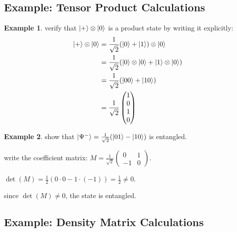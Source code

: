 \documentclass[11pt,a4paper]{article}
\theoremstyle{definition}
\newtheorem{example}{Example}[section]
\theoremstyle{remark}
\begin{document}
\subsection{Example: Tensor Product Calculations}

\begin{example}
verify that $\ket{+} \otimes \ket{0}$ is a product state by writing it explicitly:
\begin{align}
\ket{+} \otimes \ket{0} &= \frac{1}{\sqrt{2}}(\ket{0} + \ket{1}) \otimes \ket{0} \\
&= \frac{1}{\sqrt{2}}(\ket{0} \otimes \ket{0} + \ket{1} \otimes \ket{0}) \\
&= \frac{1}{\sqrt{2}}(\ket{00} + \ket{10}) \\
&= \frac{1}{\sqrt{2}}\begin{pmatrix} 1 \\ 0 \\ 1 \\ 0 \end{pmatrix}
\end{align}
\end{example}

\begin{example}
show that $\ket{\Psi^-} = \frac{1}{\sqrt{2}}(\ket{01} - \ket{10})$ is entangled.

write the coefficient matrix: $M = \frac{1}{\sqrt{2}}\begin{pmatrix} 0 & 1 \\ -1 & 0 \end{pmatrix}$.

$\det(M) = \frac{1}{2}(0 \cdot 0 - 1 \cdot (-1)) = \frac{1}{2} \neq 0$.

since $\det(M) \neq 0$, the state is entangled.
\end{example}

\subsection{Example: Density Matrix Calculations}
\end{document}
